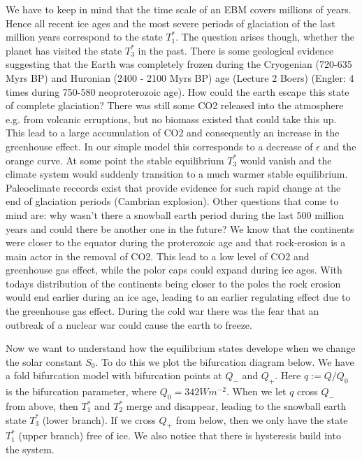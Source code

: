 \documentclass[%
thesis=student,%
coverpage=false,%
titlepage=false,%
headmarks=true, %
german,%
font=libertine, %
math=newpxtx, %
BCOR=5mm,%
coverBCOR=11mm%
]{tumbook}
\begin{document}
We have to keep in mind that the time scale of an EBM covers millions of years. Hence all recent ice ages and the most severe periods of glaciation of the last million years correspond to the state $T_{1}^*$. The question arises though, whether the planet has visited the state $T_{3}^*$ in the past. There is some geological evidence suggesting that the Earth was completely frozen during the Cryogenian (720-635 Myrs BP) and Huronian (2400 - 2100 Myrs BP) age (Lecture 2 Boers) (Engler: 4 times during 750-580 neoproterozoic age). How could the earth escape this state of complete glaciation? There was still some CO2 released into the atmosphere e.g. from volcanic erruptions, but no biomass existed that could take this up. This lead to a large accumulation of CO2 and consequently an increase in the greenhouse effect. In our simple model this corresponds to a decrease of $\epsilon$ and the orange curve. At some point the stable equilibrium $T_{3}^*$ would vanish and the climate system would suddenly transition to a much warmer stable equilibrium. Paleoclimate reccords exist that provide evidence for such rapid change at the end of glaciation periods (Cambrian explosion). Other questions that come to mind are: why wasn't there a snowball earth period during the last 500 million years and could there be another one in the future? We know that the continents were closer to the equator during the proterozoic age and that rock-erosion is a main actor in the removal of CO2. This lead to a low level of CO2 and greenhouse gas effect, while the polor caps could expand during ice ages. With todays distribution of the continents being closer to the poles the rock erosion would end earlier during an ice age, leading to an earlier regulating effect due to the greenhouse gas effect. During the cold war there was the fear that an outbreak of a nuclear war could cause the earth to freeze. 

Now we want to understand how the equilibrium states develope when we change the solar constant $S_{0}$. To do this we plot the bifurcation diagram below. We have a fold bifurcation model with bifurcation points at $Q_{-}$ and $Q_{+}$. Here $q := Q/Q_{0}$ is the bifurcation parameter, where $Q_{0} = 342 Wm^{-2}$. When we let $q$ cross $Q_{-}$ from above, then $T_{1}^*$ and $T_{2}^*$ merge and disappear, leading to the snowball earth state $T_{3}^*$ (lower branch). If we cross $Q_{+}$ from below, then we only have the state $T_{1}^*$ (upper branch) free of ice. We also notice that there is hysteresis build into the system. 
\end{document}
